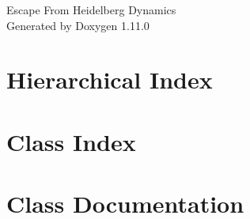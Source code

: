 \documentclass[twoside]{book}
\newcommand{\+}{\discretionary{\mbox{\scriptsize$\hookleftarrow$}}{}{}}
\newcommand{\clearemptydoublepage}{%
    \newpage{\pagestyle{empty}\cleardoublepage}%
  }
\begin{document}
  \raggedbottom
    \hypersetup{pageanchor=false,
                bookmarksnumbered=true,
                pdfencoding=unicode
               }
  \begin{titlepage}
  \vspace*{7cm}
  \begin{center}%
  {\Large Escape From Heidelberg Dynamics}\\
  \vspace*{1cm}
  {\large Generated by Doxygen 1.11.0}\\
  \end{center}
  \end{titlepage}
  \clearemptydoublepage
  \tableofcontents
  \clearemptydoublepage
  \hypersetup{pageanchor=true}

\chapter{Hierarchical Index}

\chapter{Class Index}

\chapter{Class Documentation}












  \backmatter
  \newpage
  \clearemptydoublepage
  \printindex
\end{document}
